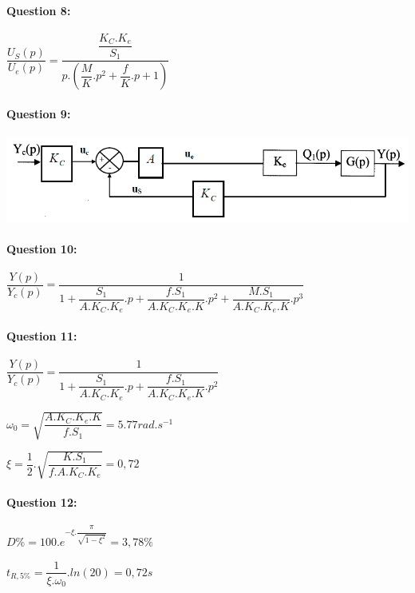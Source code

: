 \paragraph{Question 8:}

$\dfrac{U_S(p)}{U_e(p)}=\dfrac{\dfrac{K_C.K_e}{S_1}}{p.\left(\dfrac{M}{K}.p^2+\dfrac{f}{K}.p+1\right)}$

\paragraph{Question 9:}

\begin{center}
 \includegraphics[width=0.8\linewidth]{img/SB2_corrige}
\end{center}

\paragraph{Question 10:}

$\dfrac{Y(p)}{Y_c(p)}=\dfrac{1}{1+\dfrac{S_1}{A.K_C.K_e}.p+\dfrac{f.S_1}{A.K_C.K_e.K}.p^2+\dfrac{M.S_1}{A.K_C.K_e.K}.p^3}$

\paragraph{Question 11:}

$\dfrac{Y(p)}{Y_c(p)}=\dfrac{1}{1+\dfrac{S_1}{A.K_C.K_e}.p+\dfrac{f.S_1}{A.K_C.K_e.K}.p^2}$

$\omega_0=\sqrt{\dfrac{A.K_C.K_e.K}{f.S_1}}=5.77rad.s^{-1}$


$\xi=\dfrac{1}{2}.\sqrt{\dfrac{K.S_1}{f.A.K_C.K_e}}=0,72$

\paragraph{Question 12:} 

$D\%=100.e^{-\xi.\dfrac{\pi}{\sqrt{1-\xi^2}}}=3,78\%$

$t_{R,5\%}=\dfrac{1}{\xi.\omega_0}.ln(20)=0,72s$

